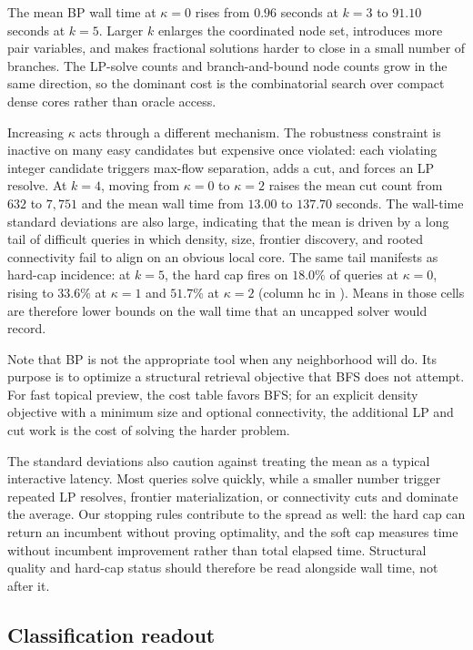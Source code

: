 \documentclass[12pt]{article}
\begin{document}


The mean BP wall time at $\kappa=0$ rises from $0.96$ seconds at $k=3$ to $91.10$ seconds at $k=5$.  Larger $k$ enlarges the coordinated node set, introduces more pair variables, and makes fractional solutions harder to close in a small number of branches.  The LP-solve counts and branch-and-bound node counts grow in the same direction, so the dominant cost is the combinatorial search over compact dense cores rather than oracle access.

Increasing $\kappa$ acts through a different mechanism.  The robustness constraint is inactive on many easy candidates but expensive once violated: each violating integer candidate triggers max-flow separation, adds a cut, and forces an LP resolve.  At $k=4$, moving from $\kappa=0$ to $\kappa=2$ raises the mean cut count from $632$ to $7{,}751$ and the mean wall time from $13.00$ to $137.70$ seconds.  The wall-time standard deviations are also large, indicating that the mean is driven by a long tail of difficult queries in which density, size, frontier discovery, and rooted connectivity fail to align on an obvious local core.  The same tail manifests as hard-cap incidence: at $k=5$, the hard cap fires on $18.0\%$ of queries at $\kappa=0$, rising to $33.6\%$ at $\kappa=1$ and $51.7\%$ at $\kappa=2$ (column $\textrm{hc}$ in ).  Means in those cells are therefore lower bounds on the wall time that an uncapped solver would record.

Note that BP is not the appropriate tool when any neighborhood will do.  Its purpose is to optimize a structural retrieval objective that BFS does not attempt.  For fast topical preview, the cost table favors BFS; for an explicit density objective with a minimum size and optional connectivity, the additional LP and cut work is the cost of solving the harder problem.

The standard deviations also caution against treating the mean as a typical interactive latency.  Most queries solve quickly, while a smaller number trigger repeated LP resolves, frontier materialization, or connectivity cuts and dominate the average.  Our stopping rules contribute to the spread as well: the hard cap can return an incumbent without proving optimality, and the soft cap measures time without incumbent improvement rather than total elapsed time.  Structural quality and hard-cap status should therefore be read alongside wall time, not after it.

\subsection{Classification readout}
\label{subsec:classification-results}
\end{document}
